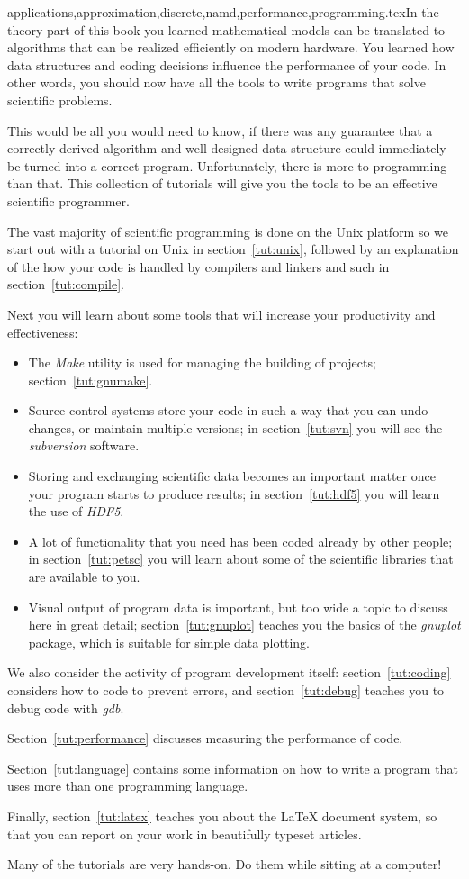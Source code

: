 {applications,approximation,discrete,namd,performance,programming}.texIn the theory part of this book you learned mathematical models can be
translated to algorithms that can be realized efficiently on modern
hardware. You learned how data structures and coding decisions
influence the performance of your code. In other words, you should now
have all the tools to write programs that solve scientific problems.

This would be all you would need to know,
if there was any guarantee that a correctly derived algorithm and
well designed data structure could immediately be turned into a
correct program.
Unfortunately, there is more to programming than that. This collection
of tutorials will give you the tools to be an effective scientific
programmer.

The vast majority of
scientific programming is done on the Unix platform so we start out
with a tutorial on Unix in section~\ref{tut:unix}, followed by an
explanation of the how your code is handled by compilers and linkers
and such in section~\ref{tut:compile}.

Next you will learn about some tools that will increase your
productivity and effectiveness: 
\begin{itemize}
\item The \emph{Make} utility is used for managing the building of
  projects; section~\ref{tut:gnumake}.
\item Source control systems store your code in such a way that you
  can undo changes, or maintain multiple versions; in
  section~\ref{tut:svn} you will see the \emph{subversion} software.
\item Storing and exchanging scientific data becomes an important
  matter once your program starts to produce results; in
  section~\ref{tut:hdf5} you will learn the use of \emph{HDF5}.
\item A lot of functionality that you need has been coded already by
  other people; in section~\ref{tut:petsc} you will learn about some
  of the scientific libraries that are available to you.
\item Visual output of program data is important, but too wide a topic
  to discuss here in great detail; section~\ref{tut:gnuplot} teaches
  you the basics of the \emph{gnuplot} package, which is suitable for
  simple data plotting.
\end{itemize}

We also consider the activity of program development itself:
section~\ref{tut:coding} considers how to code to prevent errors, and
section~\ref{tut:debug} teaches you to debug code with
\emph{gdb}. 
\begin{notready}
Section~\ref{tut:performance} discusses measuring the
performance of code.
\end{notready}
Section~\ref{tut:language} contains some information on
how to write a program that uses more than one programming language.

Finally, section~\ref{tut:latex} teaches you about the \LaTeX{}
document system, so that you can report on your work in beautifully
typeset articles.

Many of the tutorials are very hands-on. Do them while sitting at a
computer!
